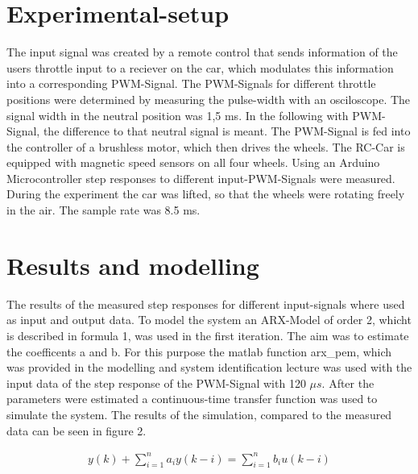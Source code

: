\documentclass[twoside]{article}
\begin{document}

\section{Experimental-setup}
The input signal was created by a remote control that sends information of the users throttle input to a reciever on the car, which modulates this information into a corresponding PWM-Signal. The PWM-Signals for different throttle positions were determined by measuring the pulse-width with an osciloscope. The signal width in the neutral position was 1,5 ms. In the following with PWM-Signal, the difference to that neutral signal is meant. The PWM-Signal is fed into the controller of a brushless motor, which then drives the wheels. The RC-Car is equipped with magnetic speed sensors on all four wheels. Using an Arduino Microcontroller step responses to different input-PWM-Signals were measured. During the experiment the car was lifted, so that the wheels were rotating freely in the air. The sample rate was 8.5 ms.



\section{Results and modelling}
The results of the measured step responses for different input-signals where used as input and output data. To model the system an ARX-Model of order 2, whicht is described in formula 1, was used in the first iteration. The aim was to estimate the coefficents a and b. For this purpose the matlab function arx\_pem, which was provided in the modelling and system identification lecture was used with the input data of the step response of the PWM-Signal with 120 $\mu s$. After the parameters were estimated a continuous-time transfer function was used to simulate the system. The results of the simulation, compared to the measured data can be seen in figure 2.

\begin{align}
y(k) + \sum_{i=1}^n a_i y(k - i) = \sum_{i=1}^n b_i u(k - i)
\end{align}
\end{document}
